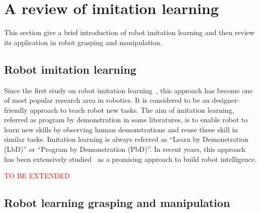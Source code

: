 \section{A review of imitation learning}
\label{cha2:sec2}

This section give a brief introduction of robot imitation learning and then review its application in robot grasping and manipulation.

\subsection{Robot imitation learning}
\label{cha2:sec2:learning}
Since the first study on robot imitation learning~\citep{friedrich1996robot}, this approach has become one of most popular research area in robotics. It is considered to be an designer-friendly approach to teach robot new tasks. The aim of imitation learning, referred as program by demonstration in some literatures, is to enable robot to learn new skills by observing human demonstrations and reuse these skill in similar tasks. Imitation learning is always referred as ``Learn by Demonstration (LbD)'' or ``Program by Demonstration (PbD)''. In recent years, this approach has been extensively studied~\citep{calinon2007learning,calinon2008robot,dillmann2004teaching,kulic2012incremental} as a promising approach to build robot intelligence.

\textcolor{red}{TO BE EXTENDED}

\subsection{Robot learning grasping and manipulation }
\label{cha2:sec2:grasping-leaning}


